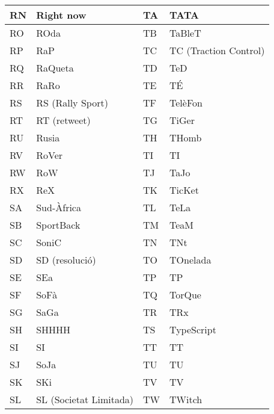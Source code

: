 \begin{table}[h]
    \centering
    \begin{tabular}{|l|l|l|l|}
    \hline
    RN & Right now              & TA & TATA                  \\ \hline
    RO & ROda                   & TB & TaBleT                \\ \hline
    RP & RaP                    & TC & TC (Traction Control) \\ \hline
    RQ & RaQueta                & TD & TeD                   \\ \hline
    RR & RaRo                   & TE & TÉ                    \\ \hline
    RS & RS (Rally Sport)       & TF & TelèFon               \\ \hline
    RT & RT (retweet)           & TG & TiGer                 \\ \hline
    RU & Rusia                  & TH & THomb                 \\ \hline
    RV & RoVer                  & TI & TI                    \\ \hline
    RW & RoW                    & TJ & TaJo                  \\ \hline
    RX & ReX                    & TK & TicKet                \\ \hline
    SA & Sud-Àfrica             & TL & TeLa                  \\ \hline
    SB & SportBack              & TM & TeaM                  \\ \hline
    SC & SoniC                  & TN & TNt                   \\ \hline
    SD & SD (resolució)         & TO & TOnelada              \\ \hline
    SE & SEa                    & TP & TP                    \\ \hline
    SF & SoFà                   & TQ & TorQue                \\ \hline
    SG & SaGa                   & TR & TRx                   \\ \hline
    SH & SHHHH                  & TS & TypeScript            \\ \hline
    SI & SI                     & TT & TT                    \\ \hline
    SJ & SoJa                   & TU & TU                    \\ \hline
    SK & SKi                    & TV & TV                    \\ \hline
    SL & SL (Societat Limitada) & TW & TWitch                \\ \hline

\end{tabular}
\end{table}
